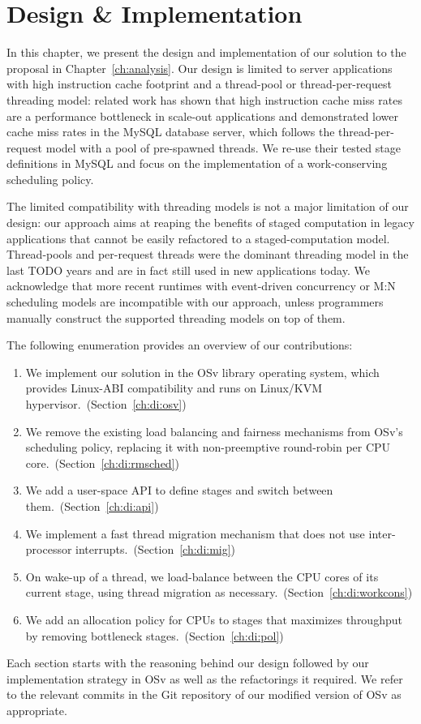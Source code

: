\documentclass[12pt,a4paper]{book}
\begin{document}
\chapter{Design \& Implementation}
In this chapter, we present the design and implementation of our solution to the proposal in Chapter~\ref{ch:analysis}.
Our design is limited to server applications with high instruction cache footprint and a thread-pool or thread-per-request threading model:
related work has shown that high instruction cache miss rates are a performance bottleneck in scale-out applications
and demonstrated lower cache miss rates in the MySQL database server, which follows the thread-per-request model with a pool of pre-spawned threads.
We re-use their tested stage definitions in MySQL  and focus on the implementation of a work-conserving scheduling policy.
\cite{kanev2015profiling,mysqlThreading}

The limited compatibility with threading models is not a major limitation of our design:
our approach aims at reaping the benefits of staged computation in legacy applications that cannot be easily refactored to a staged-computation model.
Thread-pools and per-request threads were the dominant threading model in the last TODO years and are in fact still used in new applications today.
We acknowledge that more recent runtimes with event-driven concurrency or M:N scheduling models are incompatible with our approach, unless programmers manually construct the supported threading models on top of them.

The following enumeration provides an overview of our contributions:
\begin{enumerate}
    \item We implement our solution in the OSv library operating system, which provides Linux-ABI compatibility and runs on Linux/KVM hypervisor.~(Section~\ref{ch:di:osv})
    \item We remove the existing load balancing and fairness mechanisms from OSv's scheduling policy, replacing it with non-preemptive round-robin per CPU core.~(Section~\ref{ch:di:rmsched})
    \item We add a user-space API to define stages and switch between them.~(Section~\ref{ch:di:api})
    \item We implement a fast thread migration mechanism that does not use inter-processor interrupts.~(Section~\ref{ch:di:mig})
    \item On wake-up of a thread, we load-balance between the CPU cores of its current stage, using thread migration as necessary.~(Section~\ref{ch:di:workcons})
    \item We add an allocation policy for CPUs to stages that maximizes throughput by removing bottleneck stages.~(Section~\ref{ch:di:pol})
\end{enumerate}
Each section starts with the reasoning behind our design followed by our implementation strategy in OSv as well as the refactorings it required.
We refer to the relevant commits in the Git repository of our modified version of OSv as appropriate.
\end{document}

